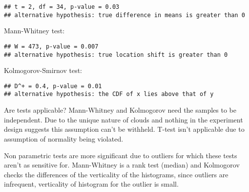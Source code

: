 \documentclass[
]{article}
\newenvironment{Shaded}{\begin{snugshade}}{\end{snugshade}}
\newcommand{\AttributeTok}[1]{\textcolor[rgb]{0.77,0.63,0.00}{#1}}
\newcommand{\FunctionTok}[1]{\textcolor[rgb]{0.00,0.00,0.00}{#1}}
\newcommand{\NormalTok}[1]{#1}
\newcommand{\SpecialCharTok}[1]{\textcolor[rgb]{0.00,0.00,0.00}{#1}}
\newcommand{\StringTok}[1]{\textcolor[rgb]{0.31,0.60,0.02}{#1}}
\begin{document}
\begin{Shaded}
\end{Shaded}

\begin{verbatim}
## t = 2, df = 34, p-value = 0.03
## alternative hypothesis: true difference in means is greater than 0
\end{verbatim}

Mann-Whitney test:

\begin{Shaded}
\end{Shaded}

\begin{verbatim}
## W = 473, p-value = 0.007
## alternative hypothesis: true location shift is greater than 0
\end{verbatim}

Kolmogorov-Smirnov test:

\begin{Shaded}
\end{Shaded}

\begin{verbatim}
## D^+ = 0.4, p-value = 0.01
## alternative hypothesis: the CDF of x lies above that of y
\end{verbatim}

Are tests applicable? Mann-Whitney and Kolmogorov need the samples to be
independent. Due to the unique nature of clouds and nothing in the
experiment design suggests this assumption can't be withheld. T-test
isn't applicable due to assumption of normality being violated.

Non parametric tests are more significant due to outliers for which
these tests aren't as sensitive for. Mann-Whitney is a rank test
(median) and Kolmogorov checks the differences of the verticality of the
histograms, since outliers are infrequent, verticality of histogram for
the outlier is small.
\end{document}
